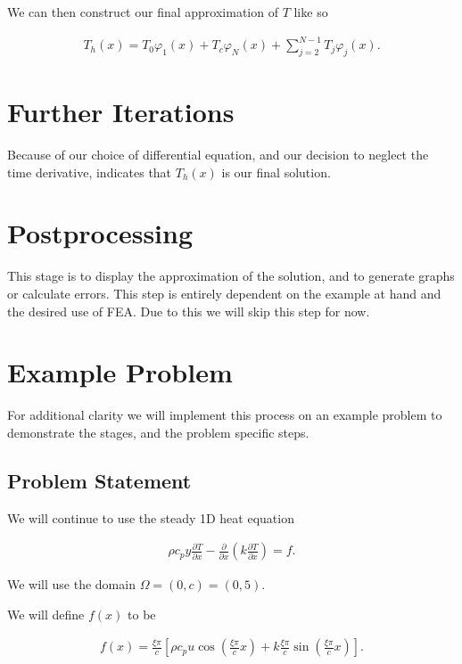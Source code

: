 \documentclass[10pt]{amsart}
\numberwithin{equation}{section}
\theoremstyle{definition}
\newcommand{\pder}[2][]{\frac{\partial#1}{\partial#2}}
\begin{document}
\begin{multicols}{2}
We can then construct our final approximation of $T$ like so

\begin{align}
  T_h(x) = T_0\varphi_1(x)+T_c\varphi_N(x)+\sum_{j=2}^{N-1}T_j\varphi_j(x).
\end{align}


\section{Further Iterations}%
\label{sec:further_iterations}

Because of our choice of differential equation, and our decision to neglect the
time derivative, indicates that $T_h(x)$ is our final solution.

\section{Postprocessing}%
\label{sec:postprocessing}

This stage is to display the approximation of the solution, and to generate
graphs or calculate errors. This step is entirely dependent on the example at
hand and the desired use of FEA. Due to this we will skip this step for now.

\section{Example Problem}%
\label{sec:example_problem}

For additional clarity we will implement this process on an example problem to
demonstrate the stages, and the problem specific steps.

\subsection{Problem Statement}%
\label{sub:problem_statement}

We will continue to use the steady 1D heat equation

\begin{align*}
  \rho c_p y\pder[T]{x}-\pder{x}\left(k\pder[T]{x}\right)=f.
\end{align*}

We will use the domain $\Omega=(0,c)=(0,5)$.

We will define $f(x)$ to be

\begin{align*}
  f(x)=\frac{\xi\pi}{c}\left[\rho c_p
  u\cos\left(\frac{\xi\pi}{c}x\right)+k\frac{\xi\pi}{c}\sin\left(\frac{\xi\pi}{c}x\right)\right].
\end{align*}


\end{multicols}
\end{document}
